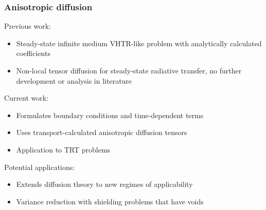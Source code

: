 \documentclass{beamer}
\begin{document}
\begin{frame}
  \frametitle{Anisotropic diffusion}
  Previous work:
  \begin{itemize}
    \item Steady-state infinite medium VHTR-like problem with analytically
      calculated coefficients \cite{Lar2009c}
    \item Non-local tensor diffusion \cite{Mor2007} for steady-state
      radiative transfer, no further development or analysis in literature
  \end{itemize}
  Current work:
  \begin{itemize}
    \item Formulates boundary conditions and time-dependent terms
    \item Uses transport-calculated anisotropic diffusion tensors
    \item Application to TRT problems
  \end{itemize}
  Potential applications:
  \begin{itemize}
    \item Extends diffusion theory to new regimes of applicability
    \item Variance reduction with shielding problems that have voids
  \end{itemize}
\end{frame}

\end{document}
